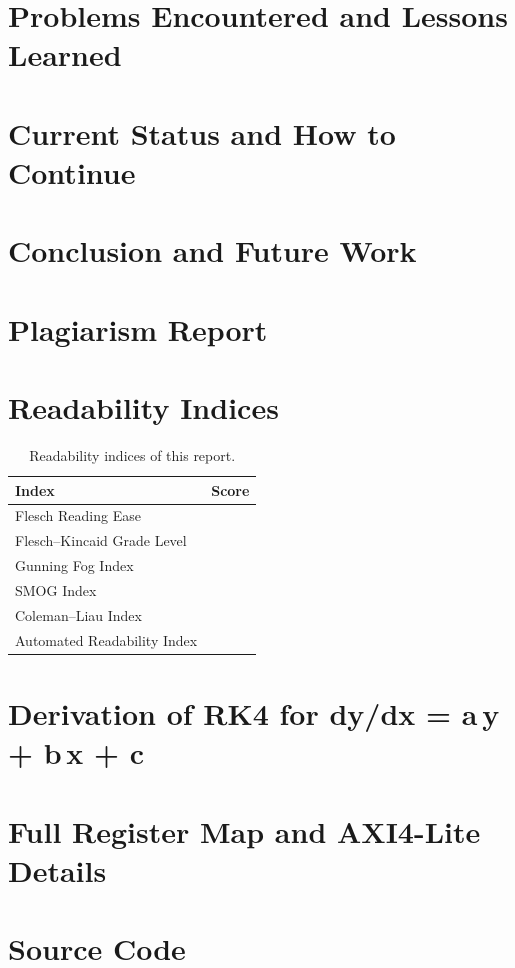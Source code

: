 \section{Problems Encountered and Lessons Learned}
\section{Current Status and How to Continue}
\section{Conclusion and Future Work}\todo{}




\appendix
\section{Plagiarism Report}\label{app:plag}

\section{Readability Indices}\label{app:read}
\begin{table}[H]
\centering
\caption{Readability indices of this report.}
\label{tab:readability}
\begin{tabular}{@{}lr@{}}
\toprule
\textbf{Index} & \textbf{Score} \\
\midrule
Flesch Reading Ease & \todo{} \\
Flesch--Kincaid Grade Level & \todo{} \\
Gunning Fog Index & \todo{} \\
SMOG Index & \todo{} \\
Coleman--Liau Index & \todo{} \\
Automated Readability Index & \todo{} \\
\bottomrule
\end{tabular}
\end{table}

\section{Derivation of RK4 for dy/dx = a\,y + b\,x + c}\label{app:rk4}\todo{}
\section{Full Register Map and AXI4-Lite Details}\label{app:regs}\todo{}
\section{Source Code}\label{app:code}

\clearpage
\printnoidxglossaries
\printindex


